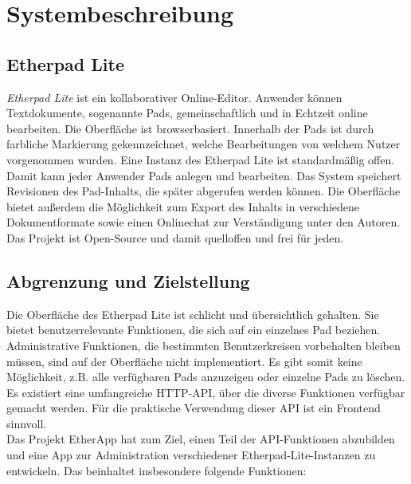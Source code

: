 \section{Systembeschreibung} %
\label{sec:system}

\subsection{Etherpad Lite}
\label{sub:system:etherpad}

\textit{Etherpad Lite} ist ein kollaborativer Online-Editor.
Anwender können Textdokumente, sogenannte Pads, gemeinschaftlich und in Echtzeit online bearbeiten.
Die Oberfläche ist browserbasiert.
Innerhalb der Pads ist durch farbliche Markierung gekennzeichnet, welche Bearbeitungen von welchem Nutzer vorgenommen wurden.
Eine Instanz des Etherpad Lite ist standardmäßig offen.
Damit kann jeder Anwender Pads anlegen und bearbeiten.
Das System speichert Revisionen des Pad-Inhalts, die später abgerufen werden können.
Die Oberfläche bietet außerdem die Möglichkeit zum Export des Inhalts in verschiedene Dokumentformate sowie einen Onlinechat zur Verständigung unter den Autoren.\\
Das Projekt ist Open-Source und damit quelloffen und frei für jeden.

\subsection{Abgrenzung und Zielstellung}
Die Oberfläche des Etherpad Lite ist schlicht und übersichtlich gehalten.
Sie bietet benutzerrelevante Funktionen, die sich auf ein einzelnes Pad beziehen.
Administrative Funktionen, die bestimmten Benutzerkreisen vorbehalten bleiben müssen, sind auf der Oberfläche nicht implementiert.
Es gibt somit keine Möglichkeit, z.B. alle verfügbaren Pads anzuzeigen oder einzelne Pads zu löschen.\\
Es existiert eine umfangreiche HTTP-API, über die diverse Funktionen verfügbar gemacht werden.
Für die praktische Verwendung dieser API ist ein Frontend sinnvoll.\\
Das Projekt EtherApp hat zum Ziel, einen Teil der API-Funktionen abzubilden und eine App zur Administration verschiedener Etherpad-Lite-Instanzen zu entwickeln.
Das beinhaltet insbesondere folgende Funktionen:

